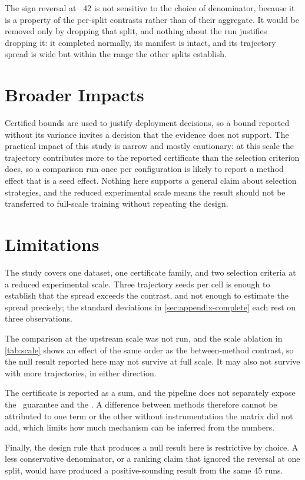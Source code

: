 The sign reversal at \splitseed~42 is not sensitive to the choice of denominator,
because it is a property of the per-split contrasts rather than of their
aggregate. It would be removed only by dropping that split, and nothing about
the run justifies dropping it: it completed normally, its manifest is intact,
and its trajectory spread is wide but within the range the other splits
establish.

\section{Broader Impacts}
\label{sec:appendix-impact}

Certified bounds are used to justify deployment decisions, so a bound reported
without its variance invites a decision that the evidence does not support. The
practical impact of this study is narrow and mostly cautionary: at this scale the
trajectory contributes more to the reported certificate than the selection
criterion does, so a comparison run once per configuration is likely to report a
method effect that is a seed effect. Nothing here supports a general claim about
selection strategies, and the reduced experimental scale means the result should
not be transferred to full-scale training without repeating the design.

\section{Limitations}
\label{sec:appendix-limitations}

The study covers one dataset, one certificate family, and two selection criteria
at a reduced experimental scale. Three trajectory seeds per cell is enough to
establish that the spread exceeds the contrast, and not enough to estimate the
spread precisely; the standard deviations in \cref{sec:appendix-complete} each
rest on three observations.

The comparison at the upstream scale was not run, and the scale ablation in
\cref{tab:scale} shows an effect of the same order as the between-method
contrast, so the null result reported here may not survive at full scale. It may
also not survive with more trajectories, in either direction.

The certificate is reported as a sum, and the pipeline does not separately
expose the \surrogate\ guarantee and the \disagreement. A difference between
methods therefore cannot be attributed to one term or the other without
instrumentation the matrix did not add, which limits how much mechanism can be
inferred from the numbers.

Finally, the design rule that produces a null result here is restrictive by
choice. A less conservative denominator, or a ranking claim that ignored the
reversal at one split, would have produced a positive-sounding result from the
same 45 runs.
